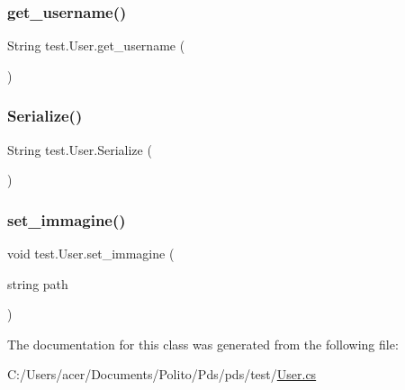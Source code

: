 \subsubsection{\texorpdfstring{get\+\_\+username()}{get\_username()}}
{\footnotesize\ttfamily String test.\+User.\+get\+\_\+username (\begin{DoxyParamCaption}{ }\end{DoxyParamCaption})}

\mbox{\label{classtest_1_1_user_ae8b9b4349a9658445ed9c1c50022a0b0}} 
\subsubsection{\texorpdfstring{Serialize()}{Serialize()}}
{\footnotesize\ttfamily String test.\+User.\+Serialize (\begin{DoxyParamCaption}{ }\end{DoxyParamCaption})}

\mbox{\label{classtest_1_1_user_ac5a4d8f26aae0be17ab0fd22410ecb0a}} 
\subsubsection{\texorpdfstring{set\+\_\+immagine()}{set\_immagine()}}
{\footnotesize\ttfamily void test.\+User.\+set\+\_\+immagine (\begin{DoxyParamCaption}\item[{string}]{path }\end{DoxyParamCaption})}



The documentation for this class was generated from the following file\+:\begin{DoxyCompactItemize}
\item 
C\+:/\+Users/acer/\+Documents/\+Polito/\+Pds/pds/test/\hyperlink{_user_8cs}{User.\+cs}\end{DoxyCompactItemize}
